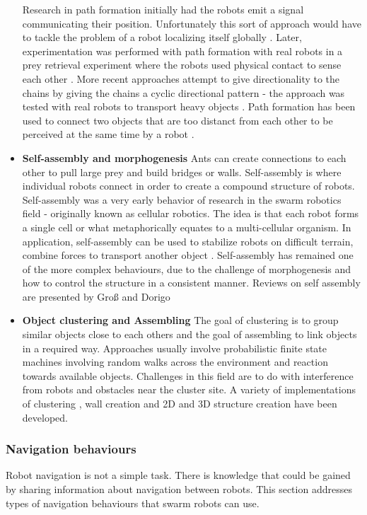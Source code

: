 \begin{itemize}
	Research in path formation initially had the robots emit a signal communicating their position. Unfortunately this sort of approach would have to tackle the problem of a robot localizing itself globally \cite{goss1992harvesting}. Later, experimentation was performed with path formation with real robots in a prey retrieval experiment where the robots used physical contact to sense each other \cite{werger1996robotic}. More recent approaches attempt to give directionality to the chains by giving the chains a cyclic directional pattern - the approach was tested with real robots to transport heavy objects \cite{nouyan2006group}. Path formation has been used to connect two objects that are too distanct from each other to be perceived at the same time by a robot \cite{nouyan2006chain}.

	\item \textbf{Self-assembly and morphogenesis}
	Ants can create connections to each other to pull large prey and build bridges or walls. Self-assembly is where individual robots connect in order to create a compound structure of robots. Self-assembly was a very early behavior of research in the swarm robotics field - originally known as cellular robotics. The idea is that each robot forms a single cell or what metaphorically equates to a multi-cellular organism. In application, self-assembly can be used to stabilize robots on difficult terrain, combine forces to transport another object \cite{brambilla2013swarm}. Self-assembly has remained one of the more complex behaviours, due to the challenge of morphogenesis and how to control the structure in a consistent manner.  
Reviews on self assembly are presented by Groß and Dorigo \cite{gross2008self}	
	
	\item \textbf{Object clustering and Assembling}
	The goal of clustering is to group similar objects close to each others and the goal of assembling to link objects in a required way. Approaches usually involve probabilistic finite state machines involving random walks across the environment and reaction towards available objects. Challenges in this field are to do with interference from robots and obstacles near the cluster site. A variety of implementations of clustering \cite{beckers1994local}, wall creation \cite{wawerla2002collective} and 2D and 3D structure creation \cite{werfel2006extended, werfel2011distributed} have been developed. 
\end{itemize}

\subsubsection{Navigation behaviours}
Robot navigation is not a simple task. There is knowledge that could be gained by sharing information about navigation between robots. This section addresses types of navigation behaviours that swarm robots can use. 

